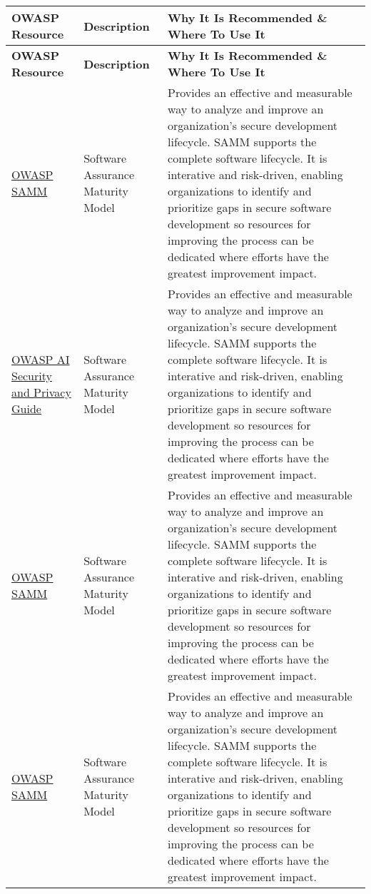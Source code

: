 \setlength\LTleft{0pt}
\setlength\LTright{0pt}
\begin{longtable}[c]{|p{}|p{}|p{}|}
  \hline
  \rowcolor{owasplightpurple}
  \textbf{OWASP Resource} &
  \textbf{Description} &
  \textbf{Why It Is Recommended \& Where To Use It} \\
  \hline
  \endfirsthead
  \hline
  \rowcolor{owasplightpurple}
  \textbf{OWASP Resource} &
  \textbf{Description} &
  \textbf{Why It Is Recommended \& Where To Use It} \\
  \hline
  \endhead
  \endfoot
  \href{https://owasp.org/www-project-samm/}{OWASP SAMM} & Software Assurance Maturity Model & Provides an effective and measurable way to analyze and improve an organization's secure development lifecycle. SAMM supports the complete software lifecycle. It is interative and risk-driven, enabling organizations to identify and prioritize gaps in secure software development so resources for improving the process can be dedicated where efforts have the greatest improvement impact. \\
  \hline
  \href{https://owasp.org/www-project-ai-security-and-privacy-guide/}{OWASP AI Security and Privacy Guide} & Software Assurance Maturity Model & Provides an effective and measurable way to analyze and improve an organization's secure development lifecycle. SAMM supports the complete software lifecycle. It is interative and risk-driven, enabling organizations to identify and prioritize gaps in secure software development so resources for improving the process can be dedicated where efforts have the greatest improvement impact. \\
  \hline
  \href{https://owasp.org/www-project-samm/}{OWASP SAMM} & Software Assurance Maturity Model & Provides an effective and measurable way to analyze and improve an organization's secure development lifecycle. SAMM supports the complete software lifecycle. It is interative and risk-driven, enabling organizations to identify and prioritize gaps in secure software development so resources for improving the process can be dedicated where efforts have the greatest improvement impact. \\
  \hline
  \href{https://owasp.org/www-project-samm/}{OWASP SAMM} & Software Assurance Maturity Model & Provides an effective and measurable way to analyze and improve an organization's secure development lifecycle. SAMM supports the complete software lifecycle. It is interative and risk-driven, enabling organizations to identify and prioritize gaps in secure software development so resources for improving the process can be dedicated where efforts have the greatest improvement impact. \\

\end{longtable}
